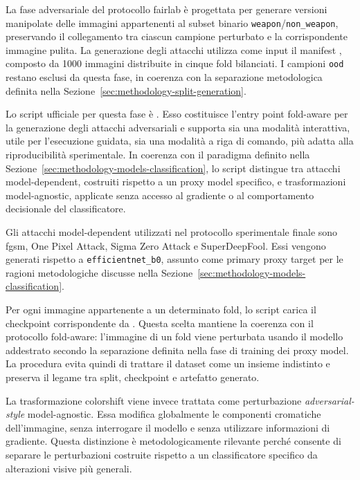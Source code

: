 La fase adversariale del protocollo \gls{fairlab} è progettata per generare
versioni manipolate delle immagini appartenenti al subset binario
\texttt{weapon}/\texttt{non\_weapon}, preservando il collegamento tra ciascun
campione perturbato e la corrispondente immagine pulita. La generazione degli
attacchi utilizza come input il manifest
, composto da
1000 immagini distribuite in cinque fold bilanciati. I campioni \texttt{ood} restano esclusi da questa fase, in coerenza con la
separazione metodologica definita nella
Sezione~\ref{sec:methodology-split-generation}.

Lo script ufficiale per questa fase è
. Esso
costituisce l'entry point fold-aware per la generazione degli attacchi
adversariali e supporta sia una modalità interattiva, utile per l'esecuzione
guidata, sia una modalità a riga di comando, più adatta alla riproducibilità
sperimentale. In coerenza con il paradigma definito nella
Sezione~\ref{sec:methodology-models-classification}, lo script distingue tra
attacchi model-dependent, costruiti rispetto a un proxy model specifico, e
trasformazioni model-agnostic, applicate senza accesso al gradiente o al
comportamento decisionale del classificatore.

Gli attacchi model-dependent utilizzati nel protocollo sperimentale finale sono
\gls{fgsm}, One Pixel Attack, Sigma Zero Attack e SuperDeepFool. Essi vengono
generati rispetto a \texttt{efficientnet\_b0}, assunto come primary proxy
target per le ragioni metodologiche discusse nella
Sezione~\ref{sec:methodology-models-classification}.

Per ogni immagine appartenente a un determinato fold, lo script carica il
checkpoint corrispondente da
. Questa scelta mantiene
la coerenza con il protocollo fold-aware: l'immagine di un fold viene perturbata
usando il modello addestrato secondo la separazione definita nella fase di
training dei proxy model. La procedura evita quindi di trattare il dataset come
un insieme indistinto e preserva il legame tra split, checkpoint e artefatto
generato.


La trasformazione \gls{colorshift} viene invece trattata come perturbazione
\textit{adversarial-style} model-agnostic. Essa modifica globalmente le
componenti cromatiche dell'immagine, senza interrogare il modello e senza
utilizzare informazioni di gradiente. Questa distinzione è metodologicamente
rilevante perché consente di separare le perturbazioni costruite rispetto a un
classificatore specifico da alterazioni visive più generali.

